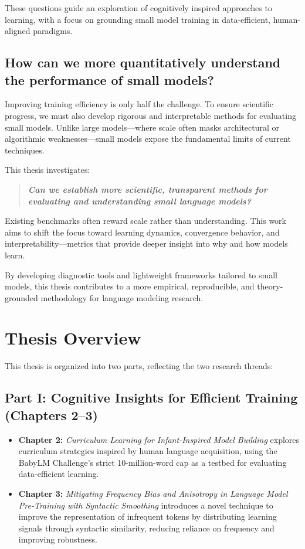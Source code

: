 These questions guide an exploration of cognitively inspired approaches to learning, with a focus on grounding small model training in data-efficient, human-aligned paradigms.

\subsection{How can we more quantitatively understand the performance of small models?}

Improving training efficiency is only half the challenge. To ensure scientific progress, we must also develop rigorous and interpretable methods for evaluating small models. Unlike large models—where scale often masks architectural or algorithmic weaknesses—small models expose the fundamental limits of current techniques.

This thesis investigates:

\begin{quote}
    \textbf{\emph{Can we establish more scientific, transparent methods for evaluating and understanding small language models?}}
\end{quote}

Existing benchmarks often reward scale rather than understanding. This work aims to shift the focus toward learning dynamics, convergence behavior, and interpretability—metrics that provide deeper insight into why and how models learn.

By developing diagnostic tools and lightweight frameworks tailored to small models, this thesis contributes to a more empirical, reproducible, and theory-grounded methodology for language modeling research.

\section*{Thesis Overview}

This thesis is organized into two parts, reflecting the two research threads:

\subsection*{Part I: Cognitive Insights for Efficient Training (Chapters 2–3)}

\begin{itemize}
    \item \textbf{Chapter 2:} \emph{Curriculum Learning for Infant-Inspired Model Building}  
    explores curriculum strategies inspired by human language acquisition, using the BabyLM Challenge's strict 10-million-word cap as a testbed for evaluating data-efficient learning.

    \item \textbf{Chapter 3:} \emph{Mitigating Frequency Bias and Anisotropy in Language Model Pre-Training with Syntactic Smoothing}  
    introduces a novel technique to improve the representation of infrequent tokens by distributing learning signals through syntactic similarity, reducing reliance on frequency and improving robustness.
\end{itemize}

